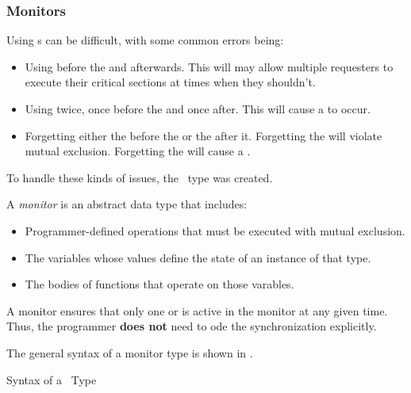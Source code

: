 \subsubsection{Monitors}\label{subsubsec:Monitors}
Using s can be difficult, with some common errors being:
\begin{itemize}[noitemsep]
\item Using  before the  and  afterwards.
  This will may allow multiple requesters to execute their critical sections at times when they shouldn't.
\item Using  twice, once before the  and once after.
  This will cause a  to occur.
\item Forgetting either the  before the  or the  after it.
  Forgetting the  will violate mutual exclusion.
  Forgetting the  will cause a .
\end{itemize}

To handle these kinds of issues, the ~type was created.

\begin{definition}[Monitor]\label{def:Monitor}
  A \emph{monitor} is an abstract data type that includes:
  \begin{itemize}[noitemsep]
  \item Programmer-defined operations that must be executed with mutual exclusion.
  \item The variables whose values define the state of an instance of that type.
  \item The bodies of functions that operate on those varables.
  \end{itemize}

  A monitor ensures that only one  or  is active in the monitor at any given time.
  Thus, the programmer \textbf{does not} need to ode the synchronization explicitly.

  The general syntax of a monitor type is shown in .
\end{definition}

\begin{listing}[h!tbp]
\caption{Syntax of a ~Type}
\label{lst:Monitor_Type_Syntax}
\end{listing}


